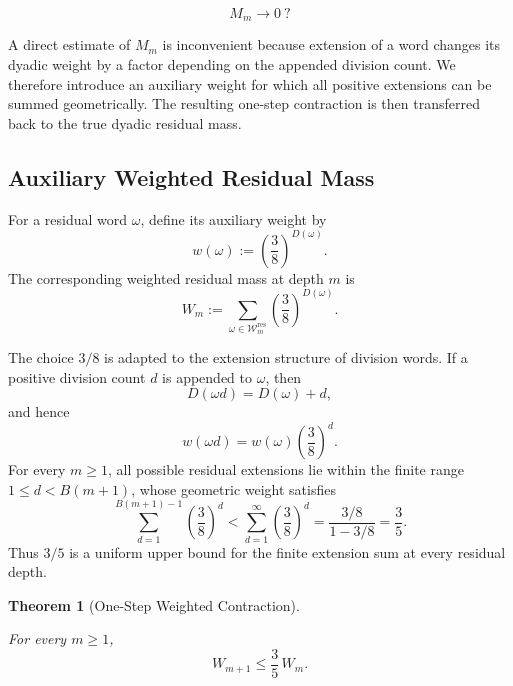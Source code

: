 \documentclass[12pt, oneside]{article}
\numberwithin{equation}{section}
\theoremstyle{definition}
\theoremstyle{plain}
\newtheorem{theorem}{Theorem}[section]
\theoremstyle{remark}
\begin{document}
\[
\boxed{M_m\longrightarrow0\ ?}
\]

A direct estimate of \(M_m\) is inconvenient because extension of a word
changes its dyadic weight by a factor depending on the appended division
count. We therefore introduce an auxiliary weight for which all positive
extensions can be summed geometrically. The resulting one-step contraction
is then transferred back to the true dyadic residual mass.

\subsection{Auxiliary Weighted Residual Mass}

For a residual word \(\omega\), define its auxiliary weight by
\[
w(\omega)
:=
\left(\frac{3}{8}\right)^{D(\omega)}.
\]
The corresponding weighted residual mass at depth \(m\) is
\[
W_m
:=
\sum_{\omega\in\mathcal W_m^{\mathrm{res}}}
\left(\frac{3}{8}\right)^{D(\omega)}.
\]

The choice \(3/8\) is adapted to the extension structure of division words.
If a positive division count \(d\) is appended to \(\omega\), then
\[
D(\omega d)=D(\omega)+d,
\]
and hence
\[
w(\omega d)
=
w(\omega)
\left(\frac{3}{8}\right)^d.
\]
For every \(m\ge1\), all possible residual extensions lie within the
finite range \(1\le d<B(m+1)\), whose geometric weight satisfies
\[
\sum_{d=1}^{B(m+1)-1}
\left(\frac38\right)^d
<
\sum_{d=1}^{\infty}
\left(\frac38\right)^d
=
\frac{3/8}{1-3/8}
=
\frac35.
\]
Thus \(3/5\) is a uniform upper bound for the finite extension sum at every
residual depth.

\begin{theorem}[One-Step Weighted Contraction]
\label{thm:weighted-residual-contraction}

For every \(m\ge1\),
\[
\boxed{
W_{m+1}\le\frac35\,W_m.
}
\]
\end{theorem}
\end{document}
